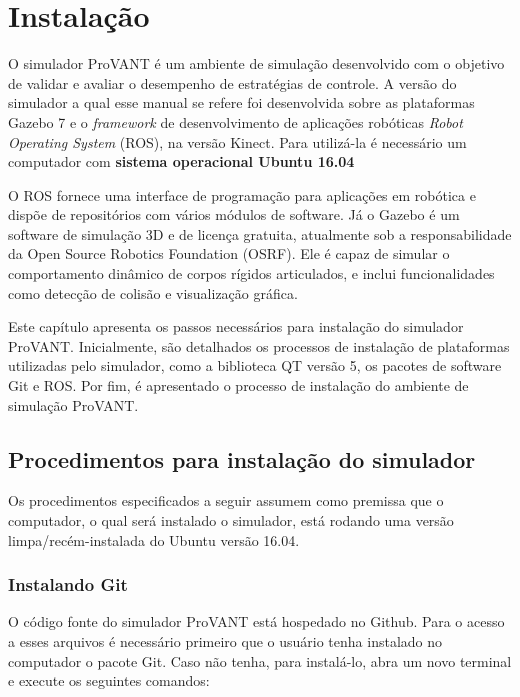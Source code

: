 \chapter{Instalação}

O simulador ProVANT é um ambiente de simulação desenvolvido com o objetivo de validar e avaliar o desempenho de estratégias de controle. A versão do simulador a qual esse manual se refere foi desenvolvida sobre as plataformas Gazebo 7 e o \textit{framework} de desenvolvimento de aplicações robóticas \textit{Robot Operating System} (ROS), na versão Kinect. Para utilizá-la é necessário um computador com \textbf{sistema operacional Ubuntu 16.04}

O ROS fornece uma interface de programação para aplicações em robótica e dispõe de repositórios com vários módulos de software. Já o Gazebo é um software de simulação 3D e de licença gratuita, atualmente sob a responsabilidade da Open Source Robotics Foundation (OSRF). Ele é capaz de simular o comportamento dinâmico de corpos rígidos articulados, e inclui funcionalidades como detecção de colisão e visualização gráfica.

Este capítulo apresenta os passos necessários para instalação do simulador ProVANT. Inicialmente, são detalhados os processos de instalação de plataformas utilizadas pelo simulador, como a biblioteca QT versão 5, os pacotes de software Git e ROS. Por fim, é apresentado o processo de instalação do ambiente de simulação ProVANT. 

\section{Procedimentos para instalação do simulador}

Os procedimentos especificados a seguir assumem como premissa que o computador, o qual será instalado o simulador, está rodando uma versão limpa/recém-instalada do Ubuntu versão 16.04. %

\subsection{Instalando Git}

O código fonte do simulador ProVANT está hospedado no Github. Para o acesso a esses arquivos é necessário primeiro que o usuário tenha instalado no computador o pacote Git. Caso não tenha, para instalá-lo, abra um novo terminal e execute os seguintes comandos:

